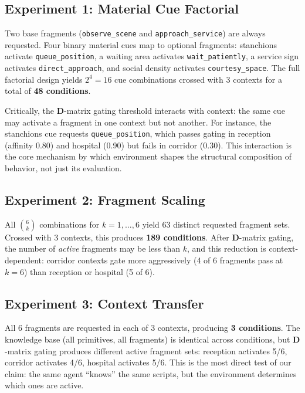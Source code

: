 \documentclass[11pt,a4paper]{article}
\newcommand{\D}{\mathbf{D}}
\begin{document}
\subsection{Experiment 1: Material Cue Factorial}

Two base fragments (\texttt{observe\_scene} and \texttt{approach\_service}) are always requested.  Four binary material cues map to optional fragments: stanchions activate \texttt{queue\_position}, a waiting area activates \texttt{wait\_patiently}, a service sign activates \texttt{direct\_approach}, and social density activates \texttt{courtesy\_space}.  The full factorial design yields $2^4 = 16$ cue combinations crossed with 3 contexts for a total of \textbf{48 conditions}.

Critically, the $\D$-matrix gating threshold interacts with context: the same cue may activate a fragment in one context but not another.  For instance, the stanchions cue requests \texttt{queue\_position}, which passes gating in reception (affinity 0.80) and hospital (0.90) but fails in corridor (0.30).  This interaction is the core mechanism by which environment shapes the structural composition of behavior, not just its evaluation.

\subsection{Experiment 2: Fragment Scaling}

All $\binom{6}{k}$ combinations for $k = 1, \ldots, 6$ yield 63 distinct requested fragment sets.  Crossed with 3 contexts, this produces \textbf{189 conditions}.  After $\D$-matrix gating, the number of \emph{active} fragments may be less than $k$, and this reduction is context-dependent: corridor contexts gate more aggressively (4 of 6 fragments pass at $k = 6$) than reception or hospital (5 of 6).

\subsection{Experiment 3: Context Transfer}

All 6 fragments are requested in each of 3 contexts, producing \textbf{3 conditions}.  The knowledge base (all primitives, all fragments) is identical across conditions, but $\D$-matrix gating produces different active fragment sets: reception activates 5/6, corridor activates 4/6, hospital activates 5/6.  This is the most direct test of our claim: the same agent ``knows'' the same scripts, but the environment determines which ones are active.
\end{document}
